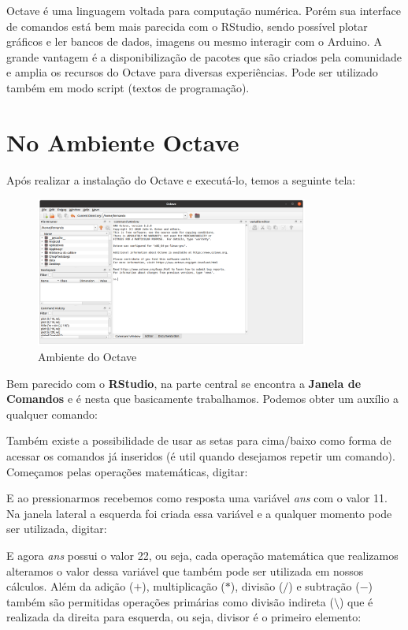 \documentclass[a4paper,11pt]{article}
\begin{document}
Octave é uma linguagem voltada para computação numérica. Porém sua interface de comandos está bem mais parecida com o RStudio, sendo possível plotar gráficos e ler bancos de dados, imagens ou mesmo interagir com o Arduino. A grande vantagem é a disponibilização de pacotes que são criados pela comunidade e amplia os recursos do Octave para diversas experiências. Pode ser utilizado também em modo script (textos de programação). 

\section{No Ambiente Octave}
Após realizar a instalação do Octave e executá-lo, temos a seguinte tela:
\begin{figure}[H]
	\centering
	\includegraphics[width=0.8\textwidth]{imagem/ambiente}
	\caption{Ambiente do Octave}
\end{figure}

Bem parecido com o \textbf{RStudio}, na parte central se encontra a \textbf{Janela de Comandos} e é nesta que basicamente trabalhamos. Podemos obter um auxílio a qualquer comando: \\

Também existe a possibilidade de usar as setas para cima/baixo como forma de acessar os comandos já inseridos (é util quando desejamos repetir um comando). Começamos pelas operações matemáticas, digitar: \\

E ao pressionarmos  recebemos como resposta uma variável \textit{ans} com o valor 11. Na janela lateral a esquerda foi criada essa variável e a qualquer momento pode ser utilizada, digitar: \\

E agora \textit{ans} possui o valor 22, ou seja, cada operação matemática que realizamos alteramos o valor dessa variável que também pode ser utilizada em nossos cálculos. Além da adição ($+$), multiplicação ($*$), divisão ($/$) e subtração ($-$) também são permitidas operações primárias como divisão indireta ($\setminus$) que é realizada da direita para esquerda, ou seja, divisor é o primeiro elemento: \\
\end{document}
